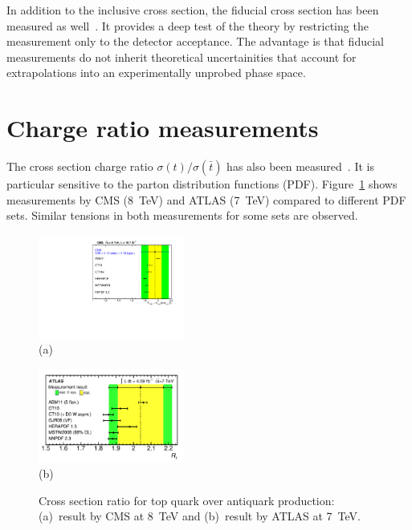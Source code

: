 \documentclass{PoS}
\begin{document}
In addition to the inclusive cross section, the fiducial cross section has been measured as well~\cite{CMS-PAS-TOP-15-007,atlas-xsec8}. It provides a deep test of the theory by restricting the measurement only to the detector acceptance. The advantage is that fiducial measurements do not inherit theoretical uncertainities that account for extrapolations into an experimentally unprobed phase space.





\section{Charge ratio measurements}
The cross section charge ratio $\sigma(t)/\sigma(\bar{t})$ has also been measured~\cite{atlas-charge7,cms-xsec8}. It is particular sensitive to the parton distribution functions (PDF). Figure~\ref{fig:charge-ratio} shows measurements by CMS (8~TeV) and ATLAS (7~TeV) compared to different PDF sets. Similar tensions in both measurements for some sets are observed. 

\begin{figure}[htbp]
\begin{center}
\parbox[t]{0.45\textwidth}{\centering\includegraphics[width=0.43\textwidth]{cms_xsec8/charge.pdf}\\(a)}
\parbox[t]{0.45\textwidth}{\centering\includegraphics[width=0.43\textwidth]{atlas_charge7/charge.pdf}\\(b)}
\end{center}
\caption{\label{fig:charge-ratio}Cross section ratio for top quark over antiquark production: (a)~result by CMS at 8~TeV and (b)~result by ATLAS at 7~TeV.}

\end{figure}
\end{document}
